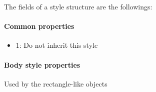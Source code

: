 \documentclass[letterpaper,10pt,english]{sphinxmanual}
\begin{document}
The fields of a style structure are the followings:


\paragraph{Common properties}
\label{\detokenize{overview/styles:common-properties}}\begin{itemize}
\item {} 
 1: Do not inherit this style

\end{itemize}


\paragraph{Body style properties}
\label{\detokenize{overview/styles:body-style-properties}}
Used by the rectangle-like objects
\end{document}
